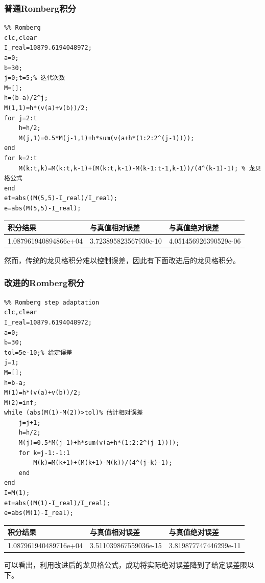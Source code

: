 \documentclass[a4paper,12pt]{ctexart}
\begin{document}
\subsubsection{普通Romberg积分}
\begin{lstlisting}
%% Romberg
clc,clear
I_real=10879.6194048972;
a=0;
b=30;
j=0;t=5;% 迭代次数
M=[];
h=(b-a)/2^j;
M(1,1)=h*(v(a)+v(b))/2;
for j=2:t
    h=h/2;
    M(j,1)=0.5*M(j-1,1)+h*sum(v(a+h*(1:2:2^(j-1)))); 
end
for k=2:t
    M(k:t,k)=M(k:t,k-1)+(M(k:t,k-1)-M(k-1:t-1,k-1))/(4^(k-1)-1); % 龙贝格公式
end
et=abs((M(5,5)-I_real)/I_real);
e=abs(M(5,5)-I_real);
\end{lstlisting}
\begin{table}[H]
    \centering
    \begin{tabular}{lll}
        \hline
        积分结果              & 与真值相对误差        & 与真值绝对误差        \\ \hline
        1.087961940894866e+04 & 3.723895823567930e-10 & 4.051456926390529e-06 \\ \hline
    \end{tabular}
\end{table}
然而，传统的龙贝格积分难以控制误差，因此有下面改进后的龙贝格积分。

\subsubsection{改进的Romberg积分}
\begin{lstlisting}
%% Romberg step adaptation
clc,clear
I_real=10879.6194048972;
a=0;
b=30;
tol=5e-10;% 给定误差
j=1;
M=[];
h=b-a;
M(1)=h*(v(a)+v(b))/2;
M(2)=inf;
while (abs(M(1)-M(2))>tol)% 估计相对误差
    j=j+1;
    h=h/2;
    M(j)=0.5*M(j-1)+h*sum(v(a+h*(1:2:2^(j-1))));
    for k=j-1:-1:1
        M(k)=M(k+1)+(M(k+1)-M(k))/(4^(j-k)-1); 
    end
end
I=M(1);
et=abs((M(1)-I_real)/I_real);
e=abs(M(1)-I_real);
\end{lstlisting}
\begin{table}[H]
    \centering
    \begin{tabular}{lll}
        \hline
        积分结果              & 与真值相对误差        & 与真值绝对误差        \\ \hline
        1.087961940489716e+04 & 3.511039867559036e-15 & 3.819877747446299e-11 \\ \hline
    \end{tabular}
\end{table}
\par
可以看出，利用改进后的龙贝格公式，成功将实际绝对误差降到了给定误差限以下。
\end{document}
